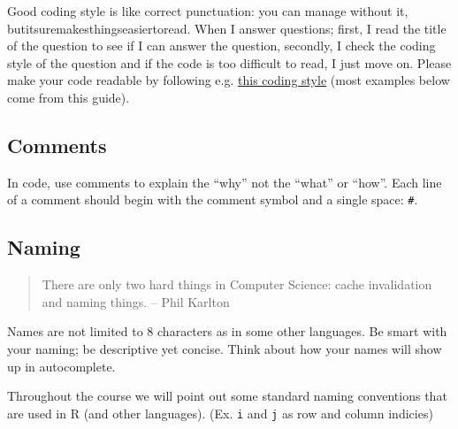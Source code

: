 \documentclass[]{book}
\newenvironment{Shaded}{\begin{snugshade}}{\end{snugshade}}
\newcommand{\KeywordTok}[1]{\textcolor[rgb]{0.13,0.29,0.53}{\textbf{#1}}}
\newcommand{\DecValTok}[1]{\textcolor[rgb]{0.00,0.00,0.81}{#1}}
\newcommand{\StringTok}[1]{\textcolor[rgb]{0.31,0.60,0.02}{#1}}
\newcommand{\CommentTok}[1]{\textcolor[rgb]{0.56,0.35,0.01}{\textit{#1}}}
\newcommand{\OperatorTok}[1]{\textcolor[rgb]{0.81,0.36,0.00}{\textbf{#1}}}
\newcommand{\NormalTok}[1]{#1}
\theoremstyle{definition}
\theoremstyle{definition}
\theoremstyle{definition}
\theoremstyle{remark}
\begin{document}
Good coding style is like correct punctuation: you can manage without
it, butitsuremakesthingseasiertoread. When I answer questions; first, I
read the title of the question to see if I can answer the question,
secondly, I check the coding style of the question and if the code is
too difficult to read, I just move on. Please make your code readable by
following e.g. \href{http://style.tidyverse.org/}{this coding style}
(most examples below come from this guide).

\subsection{Comments}\label{comments}

In code, use comments to explain the ``why'' not the ``what'' or
``how''. Each line of a comment should begin with the comment symbol and
a single space: \texttt{\#}.

\subsection{Naming}\label{naming}

\begin{quote}
There are only two hard things in Computer Science: cache invalidation
and naming things. -- Phil Karlton
\end{quote}

Names are not limited to 8 characters as in some other languages. Be
smart with your naming; be descriptive yet concise. Think about how your
names will show up in autocomplete.

Throughout the course we will point out some standard naming conventions
that are used in R (and other languages). (Ex. \texttt{i} and \texttt{j}
as row and column indicies)

\begin{Shaded}
\end{Shaded}
\end{document}
